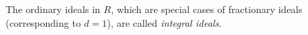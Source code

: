 The ordinary ideals in $R$, which are special cases of fractionary ideals (corresponding to $d = 1$), are called \textit{integral ideals}.
